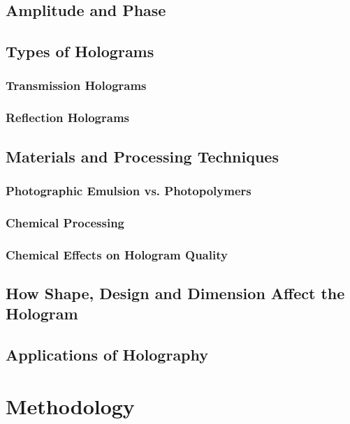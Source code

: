 \documentclass[12pt]{article}
\begin{document}
\subsection{Amplitude and Phase}


\subsection{Types of Holograms}

\subsubsection{Transmission Holograms}



\subsubsection{Reflection Holograms}





\subsection{Materials and Processing Techniques}

\subsubsection{Photographic Emulsion vs. Photopolymers}


\subsubsection{Chemical Processing}


\subsubsection{Chemical Effects on Hologram Quality}


\subsection{How Shape, Design and Dimension Affect the Hologram}


\subsection{Applications of Holography}


\section{Methodology} \label{sec:2}
\end{document}
